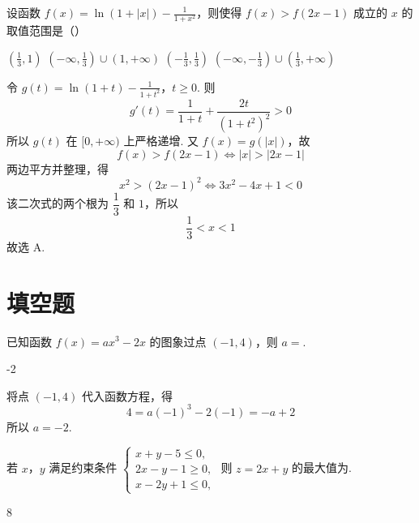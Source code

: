 \begin{problem}
设函数 \( f(x) = \ln (1 + |x|) - \frac{1}{1 + x^2} \)，则使得 \( f(x) > f(2x - 1) \) 成立的 \(x\) 的取值范围是（\quad）

\choices
    {\(\left(\frac{1}{3}, 1\right)\)}
    {\(\left(-\infty, \frac{1}{3}\right) \cup (1, +\infty)\)}
    {\(\left(-\frac{1}{3}, \frac{1}{3}\right)\)}
    {\(\left(-\infty, -\frac{1}{3}\right) \cup \left(\frac{1}{3}, +\infty\right)\)}
\end{problem}


\begin{solution}
令
\(g(t)=\ln(1+t)-\frac{1}{1+t^{2}}\)，\(t\geqslant0\).
则
\[
g'(t)=\frac{1}{1+t}+\frac{2t}{(1+t^{2})^{2}}>0
\]
所以 \(g(t)\) 在 \([0,+\infty)\) 上严格递增. 又 \(f(x)=g(|x|)\)，故
\[
f(x)>f(2x-1)\Longleftrightarrow |x|>|2x-1|
\]
两边平方并整理，得
\[
x^{2}>(2x-1)^{2}\Longleftrightarrow 3x^{2}-4x+1<0
\]
该二次式的两个根为 \(\dfrac13\) 和 \(1\)，所以
\[
\frac13<x<1
\]
故选 A.
\end{solution}

\section{填空题}

\begin{problem}
已知函数 \( f(x) = ax^3 - 2x \) 的图象过点 \((-1,4)\)，则 \(a =\)\fillinblank{}.
\end{problem}

\begin{answer}
-2
\end{answer}

\begin{solution}
将点 \((-1,4)\) 代入函数方程，得
\[
4=a(-1)^{3}-2(-1)=-a+2
\]
所以 \(a=-2\).
\end{solution}

\begin{problem}
若 \(x\)，\(y\) 满足约束条件 \(\begin{cases}
x + y - 5 \leqslant 0,\\
2x - y - 1 \geqslant 0,\\
x - 2y + 1 \leqslant 0,
\end{cases}\) 则 \(z = 2x + y\) 的最大值为\fillinblank{}.
\end{problem}

\begin{answer}
8
\end{answer}

